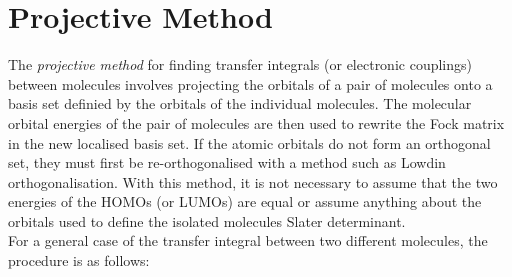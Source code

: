 \documentclass[a4paper,12pt]{article}
\begin{document}
\section{Projective Method}

The \textit{projective method} for finding transfer integrals (or electronic couplings) between molecules involves projecting the orbitals of a pair of molecules onto a basis set definied by the orbitals of the individual molecules. The molecular orbital energies of the pair of molecules are then used to rewrite the Fock matrix in the new localised basis set. If the atomic orbitals do not form an orthogonal set, they must first be re-orthogonalised with a method such as Lowdin orthogonalisation. With this method, it is not necessary to assume that the two energies of the HOMOs (or LUMOs) are equal or assume anything about the orbitals used to define the isolated molecules Slater determinant.\\

For a general case of the transfer integral between two different molecules, the procedure is as follows:
\end{document}
